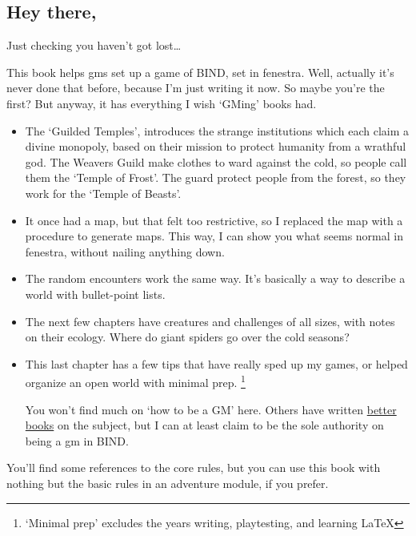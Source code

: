 \begin{multicols}{2}

\subsection{Hey there,}

Just checking you haven't got lost\ldots

This book helps \glspl{gm} set up a game of BIND, set in \gls{fenestra}.
Well, actually it's never done that before, because I'm just writing it now.
So maybe you're the first?
But anyway, it has everything I wish `GMing' books had.

\begin{itemize}
  \item
  The `Guilded Temples', introduces the strange institutions which each claim a divine monopoly, based on their mission to protect humanity from a wrathful god.
  The Weavers Guild make clothes to ward against the cold, so people call them the `Temple of Frost'.
  The \gls{guard} protect people from the forest, so they work for the `Temple of Beasts'.
  \item
  It once had a map, but that felt too restrictive, so I replaced the map with a procedure to generate maps.
  This way, I can show you what seems normal in \gls{fenestra}, without nailing anything down.
  \item
  The random encounters work the same way.
  It's basically a way to describe a world with bullet-point lists.
  \item
  The next few chapters have creatures and challenges of all sizes, with notes on their ecology.
  Where do giant spiders go over the cold seasons?
  \item
  This last chapter has a few tips that have really sped up my games, or helped organize an open world with minimal prep.%
  \footnote{`Minimal prep' excludes the years writing, playtesting, and learning \LaTeX}

  You won't find much on `how to be a GM' here.
  Others have written \href{https://thealexandrian.net/so-you-want-to-be-a-game-master}{better books} on the subject, but I can at least claim to be the sole authority on being a \gls{gm} in BIND.

\end{itemize}

You'll find some references to the core rules, but you can use this book with nothing but the basic rules in an adventure module, if you prefer.


\end{multicols}
